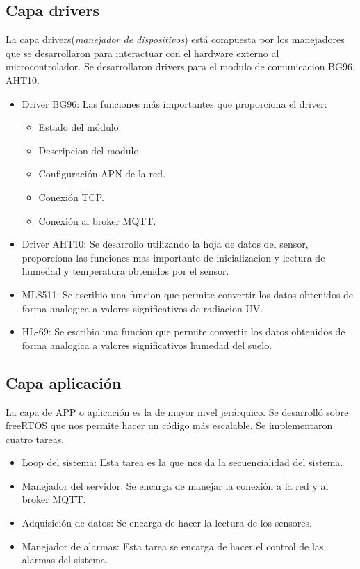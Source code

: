 \subsection{Capa drivers} 
La capa drivers(\textit{manejador de dispositivos}) está compuesta por los manejadores que se desarrollaron para interactuar con el hardware externo al microcontrolador. Se desarrollaron drivers para el modulo de comunicacion BG96, AHT10.
\begin{itemize}
  \item Driver BG96: Las funciones más importantes que proporciona el driver:
  \begin{itemize}
    \item Estado del módulo.
    \item Descripcion del modulo.
    \item Configuración APN de la red.
    \item Conexión TCP.
    \item Conexión al broker MQTT.
  \end{itemize}
  \item Driver AHT10: Se desarrollo utilizando la hoja de datos del sensor, proporciona las funciones mas importante de inicializacion y lectura de humedad y temperatura obtenidos por el sensor.
  \item ML8511: Se escribio una funcion que permite convertir los datos obtenidos de forma analogica a valores significativos de radiacion UV.
  \item HL-69: Se escribio una funcion que permite convertir los datos obtenidos de forma analogica a valores significativos humedad del suelo. 
\end{itemize}

\subsection{Capa aplicación} 
La capa de APP o aplicación  es la de mayor nivel jerárquico. Se desarrolló sobre freeRTOS 
que nos permite hacer un código más escalable.
Se implementaron cuatro tareas.
\begin{itemize}
    \item Loop del sistema: Esta tarea es la que nos da la secuencialidad del sistema.
    \item Manejador del  servidor: Se encarga de manejar la conexión a la red y al broker MQTT.
    \item Adquisición de datos: Se encarga de hacer la lectura de los sensores.
    \item Manejador de alarmas: Esta tarea se encarga de hacer el control de las alarmas del sistema.
\end{itemize}
\clearpage

